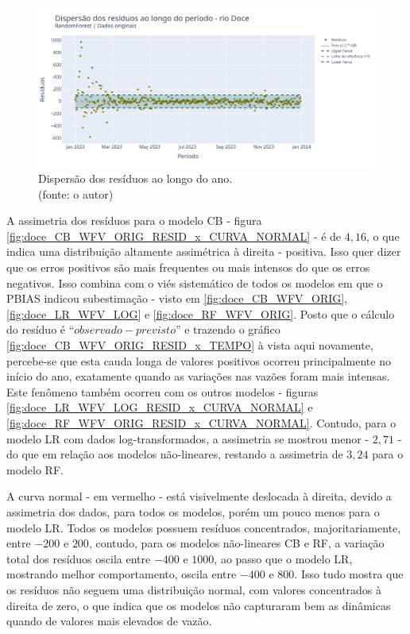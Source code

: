 \begin{figure}[!h]
	\centering
	\includegraphics[scale=0.33]{Figuras/rio_doce/wfv/RF/RF_WFV_ORIG_RESID_x_TEMPO.png}
	\caption{Dispersão dos resíduos ao longo do ano.\\(fonte: o autor)}
	\label{fig:doce_RF_WFV_ORIG_RESID_x_TEMPO}
\end{figure}
\clearpage

A assimetria dos resíduos para o modelo CB - figura \ref{fig:doce_CB_WFV_ORIG_RESID_x_CURVA_NORMAL} - é de $4,16$, o que indica uma distribuição altamente assimétrica à direita - positiva. Isso quer dizer que os erros positivos são mais frequentes ou mais intensos do que os erros negativos. Isso combina com o viés sistemático de todos os modelos em que o PBIAS indicou subestimação - visto em \ref{fig:doce_CB_WFV_ORIG}, \ref{fig:doce_LR_WFV_LOG} e \ref{fig:doce_RF_WFV_ORIG}. Posto que o cálculo do resíduo é ``$observado - previsto$'' e trazendo o gráfico \ref{fig:doce_CB_WFV_ORIG_RESID_x_TEMPO} à vista aqui novamente, percebe-se que esta cauda longa de valores positivos ocorreu principalmente no início do ano, exatamente quando as variações nas vazões foram mais intensas. Este fenômeno também ocorreu com os outros modelos - figuras \ref{fig:doce_LR_WFV_LOG_RESID_x_CURVA_NORMAL} e \ref{fig:doce_RF_WFV_ORIG_RESID_x_CURVA_NORMAL}. Contudo, para o modelo LR com dados log-transformados, a assimetria se mostrou menor - $2,71$ - do que em relação aos modelos não-lineares, restando a assimetria de $3,24$ para o modelo RF.

A curva normal - em vermelho - está visivelmente deslocada à direita, devido a assimetria dos dados, para todos os modelos, porém um pouco menos para o modelo LR. Todos os modelos possuem resíduos concentrados, majoritariamente, entre $-200$ e $200$, contudo, para os modelos não-lineares CB e RF, a variação total dos resíduos oscila entre $-400$ e $1000$, ao passo que o modelo LR, mostrando melhor comportamento, oscila entre $-400$ e $800$. Isso tudo mostra que os resíduos não seguem uma distribuição normal, com valores concentrados à direita de zero, o que indica que os modelos não capturaram bem as dinâmicas quando de valores mais elevados de vazão.

